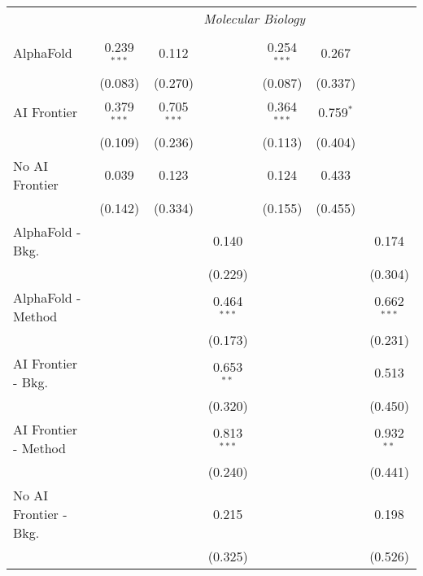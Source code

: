 \begin{tabular}{lcccccc}
 & \multicolumn{6}{c}{\textit{Molecular Biology}} \\ \\
   AlphaFold               & 0.239$^{***}$ & 0.112         &               & 0.254$^{***}$ & 0.267       &   \\   
                           & (0.083)       & (0.270)       &               & (0.087)       & (0.337)     &   \\   
   AI Frontier             & 0.379$^{***}$ & 0.705$^{***}$ &               & 0.364$^{***}$ & 0.759$^{*}$ &   \\   
                           & (0.109)       & (0.236)       &               & (0.113)       & (0.404)     &   \\   
   No AI Frontier          & 0.039         & 0.123         &               & 0.124         & 0.433       &   \\   
                           & (0.142)       & (0.334)       &               & (0.155)       & (0.455)     &   \\   
   AlphaFold - Bkg.        &               &               & 0.140         &               &             & 0.174\\   
                           &               &               & (0.229)       &               &             & (0.304)\\   
   AlphaFold - Method      &               &               & 0.464$^{***}$ &               &             & 0.662$^{***}$\\   
                           &               &               & (0.173)       &               &             & (0.231)\\   
   AI Frontier - Bkg.      &               &               & 0.653$^{**}$  &               &             & 0.513\\   
                           &               &               & (0.320)       &               &             & (0.450)\\   
   AI Frontier - Method    &               &               & 0.813$^{***}$ &               &             & 0.932$^{**}$\\   
                           &               &               & (0.240)       &               &             & (0.441)\\   
   No AI Frontier - Bkg.   &               &               & 0.215         &               &             & 0.198\\   
                           &               &               & (0.325)       &               &             & (0.526)\\   

\end{tabular}
